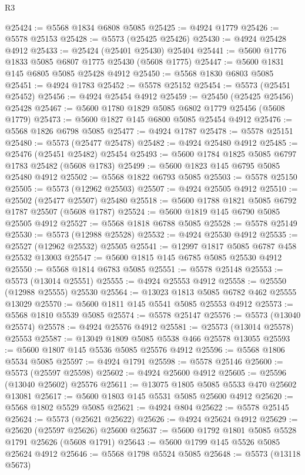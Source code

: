 \begin{lexlean}{R3}
\begin{coremodule}
@25424 := @5568 @1834 @6808 @5085
@25425 := @4924 @1779
@25426 := @5578 @25153
@25428 := @5573 (@25425 @25426)
@25430 := @4924 @25428 @4912
@25433 := @25424 (@25401 @25430) @25404
@25441 := @5600 @1776 @1833 @5085 @6807 @1775 @25430 (@5608 @1775)
@25447 := @5600 @1831 @145 @6805 @5085 @25428 @4912
@25450 := @5568 @1830 @6803 @5085
@25451 := @4924 @1783
@25452 := @5578 @25152
@25454 := @5573 (@25451 @25452)
@25456 := @4924 @25454 @4912
@25459 := @25450 (@25425 @25456) @25428
@25467 := @5600 @1780 @1829 @5085 @6802 @1779 @25456 (@5608 @1779)
@25473 := @5600 @1827 @145 @6800 @5085 @25454 @4912
@25476 := @5568 @1826 @6798 @5085
@25477 := @4924 @1787
@25478 := @5578 @25151
@25480 := @5573 (@25477 @25478)
@25482 := @4924 @25480 @4912
@25485 := @25476 (@25451 @25482) @25454
@25493 := @5600 @1784 @1825 @5085 @6797 @1783 @25482 (@5608 @1783)
@25499 := @5600 @1823 @145 @6795 @5085 @25480 @4912
@25502 := @5568 @1822 @6793 @5085
@25503 := @5578 @25150
@25505 := @5573 (@12962 @25503)
@25507 := @4924 @25505 @4912
@25510 := @25502 (@25477 @25507) @25480
@25518 := @5600 @1788 @1821 @5085 @6792 @1787 @25507 (@5608 @1787)
@25524 := @5600 @1819 @145 @6790 @5085 @25505 @4912
@25527 := @5568 @1818 @6788 @5085
@25528 := @5578 @25149
@25530 := @5573 (@12988 @25528)
@25532 := @4924 @25530 @4912
@25535 := @25527 (@12962 @25532) @25505
@25541 := @12997 @1817 @5085 @6787 @458 @25532 @13003
@25547 := @5600 @1815 @145 @6785 @5085 @25530 @4912
@25550 := @5568 @1814 @6783 @5085
@25551 := @5578 @25148
@25553 := @5573 (@13014 @25551)
@25555 := @4924 @25553 @4912
@25558 := @25550 (@12988 @25555) @25530
@25564 := @13023 @1813 @5085 @6782 @462 @25555 @13029
@25570 := @5600 @1811 @145 @5541 @5085 @25553 @4912
@25573 := @5568 @1810 @5539 @5085
@25574 := @5578 @25147
@25576 := @5573 (@13040 @25574)
@25578 := @4924 @25576 @4912
@25581 := @25573 (@13014 @25578) @25553
@25587 := @13049 @1809 @5085 @5538 @466 @25578 @13055
@25593 := @5600 @1807 @145 @5536 @5085 @25576 @4912
@25596 := @5568 @1806 @5534 @5085
@25597 := @4924 @1791
@25598 := @5578 @25146
@25600 := @5573 (@25597 @25598)
@25602 := @4924 @25600 @4912
@25605 := @25596 (@13040 @25602) @25576
@25611 := @13075 @1805 @5085 @5533 @470 @25602 @13081
@25617 := @5600 @1803 @145 @5531 @5085 @25600 @4912
@25620 := @5568 @1802 @5529 @5085
@25621 := @4924 @804
@25622 := @5578 @25145
@25624 := @5573 (@25621 @25622)
@25626 := @4924 @25624 @4912
@25629 := @25620 (@25597 @25626) @25600
@25637 := @5600 @1792 @1801 @5085 @5528 @1791 @25626 (@5608 @1791)
@25643 := @5600 @1799 @145 @5526 @5085 @25624 @4912
@25646 := @5568 @1798 @5524 @5085
@25648 := @5573 (@13118 @5673)

\end{coremodule}
\end{lexlean}
